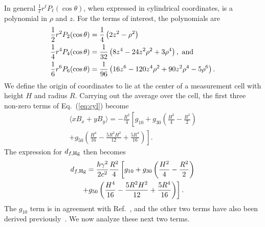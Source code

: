 \documentclass[preprint,12pt]{elsarticle}
\begin{document}

In general $\frac{1}{\ell}r^\ell P_\ell(\cos\theta)$, when expressed
in cylindrical coordinates, is a polynomial in $\rho$ and $z$.  For
the terms of interest, the polynomials are
\begin{align}
\frac{1}{2}r^2P_2(\cos\theta)&=\frac{1}{4}\left(2z^2-\rho^2\right)\\
\frac{1}{4}r^4P_4(\cos\theta)&=\frac{1}{32}\left(8z^{4}-24z^{2}\rho^{2}+3\rho^{4}\right),~{\rm and}\\
\frac{1}{6}r^6P_6(\cos\theta)&=\frac{1}{96}\left(16z^{6}-120z^{4}\rho^{2}+90z^{2}\rho^{4}-5\rho^{6}\right).
\end{align}
We define the origin of coordinates to lie at the center of a
measurement cell with height $H$ and radius $R$.  Carrying out the
average over the cell, the first three non-zero terms of
Eq.~(\ref{eq:cyl}) become
\begin{multline}
\label{eq:xbc}
  \langle xB_x+yB_y\rangle
=-\frac{R^{2}}{4}\left[g_{10}
+g_{30}\left(\frac{H^{2}}{4}-\frac{R^2}{2}\right)\right.\\
  \left.+g_{50}\left(\frac{H^{4}}{16}-\frac{5R^2H^2}{12}+\frac{5R^4}{16}\right)\right].
\end{multline}
The expression for $d_{f,\rm Hg}$ then becomes
\begin{multline}
d_{f,\rm Hg}=\frac{\hbar\gamma^{2}}{2c^{2}}\frac{R^2}{4}
\left[g_{10}
+g_{30}\left(\frac{H^{2}}{4}-\frac{R^2}{2}\right)\right.\\
  \left.+g_{50}\left(\frac{H^{4}}{16}-\frac{5R^2H^2}{12}+\frac{5R^4}{16}\right)\right].
\end{multline}
The $g_{10}$ term is in agreement with Ref.~\cite{bib:pignol-roccia},
and the other two terms have also been derived
previously~\cite{bib:pignol-priv}.  We now analyze these next two
terms.

\end{document}
